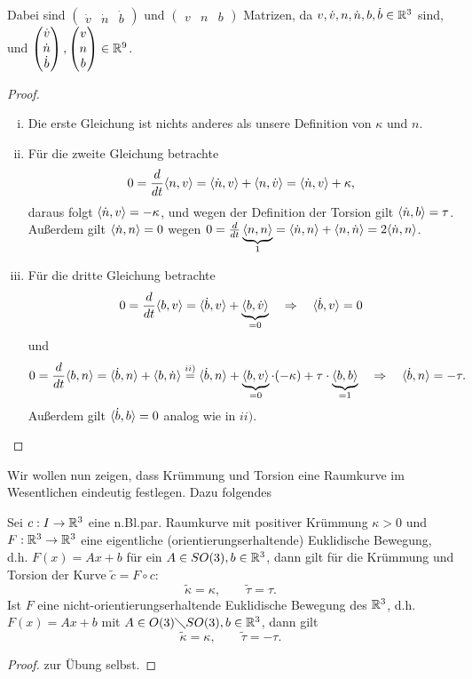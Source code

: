 \documentclass[11pt]{scrbook}
\begin{document}
\begin{st}
\begin{note*}
Dabei sind $\begin{pmatrix} \dot v & \dot n & \dot b \end{pmatrix}$ und $\begin{pmatrix}  v &  n &  b \end{pmatrix}$ Matrizen, da $v, \dot v, n, \dot n, b, \dot b \in \mathbb{R}^3$ sind, und $\begin{pmatrix} \dot v \\ \dot n \\ \dot b \end{pmatrix}, \begin{pmatrix}  v \\  n \\  b \end{pmatrix} \in \mathbb{R}^9$.
\end{note*}
\begin{proof}
\begin{enumerate}[i)]
\item
	Die erste Gleichung ist nichts anderes als unsere Definition von $\kappa$ und $n$.
\item
	Für die zweite Gleichung betrachte 
\[ 0 = \frac{d}{dt} \langle n, v \rangle = \langle \dot n, v \rangle + \langle n, \dot v \rangle = \langle \dot n, v \rangle + \kappa ,\]
daraus folgt $\langle \dot n, v \rangle = - \kappa$, und wegen der Definition der Torsion gilt $\langle \dot n, b \rangle =  \tau$. Außerdem gilt $\langle \dot n, n \rangle = 0$ wegen $0 = \frac{d}{dt} \underbrace{\langle n, n \rangle}_{1} = \langle \dot n, n \rangle + \langle n, \dot n \rangle = 2 \langle \dot n, n \rangle$.
\item
	Für die dritte Gleichung betrachte
\[ 0 = \frac{d}{dt} \langle b, v \rangle = \langle \dot b, v \rangle + \underbrace{\langle b, \dot v \rangle}_{=0} \quad \Rightarrow \quad \langle \dot b, v \rangle = 0 \]
und 
\[ 0 = \frac{d}{dt} \langle b, n \rangle = \langle \dot b, n \rangle + \langle b, \dot n \rangle \stackrel{ii)}{=} \langle \dot b, n \rangle + \underbrace{\langle b, v \rangle}_{=0} \cdot (-\kappa) + \tau \cdot \underbrace{\langle b, b \rangle}_{=1} \quad \Rightarrow \quad \langle \dot b, n \rangle = - \tau. \]
Außerdem gilt $\langle \dot b, b \rangle = 0$ analog wie in $ii)$.
\end{enumerate}
\end{proof}
\end{st}

Wir wollen nun zeigen, dass Krümmung und Torsion eine Raumkurve im Wesentlichen eindeutig festlegen. Dazu folgendes 
\begin{lem}
\label{7.8}
Sei $c: I \to \mathbb{R}^3$ eine n.Bl.par. Raumkurve mit positiver Krümmung $\kappa > 0$ und $F: \mathbb{R}^3 \to \mathbb{R}^3$ eine eigentliche (orientierungserhaltende) Euklidische Bewegung, d.h. $F(x) = Ax + b$ für ein $A \in SO(3), b \in \mathbb{R}^3$, dann gilt für die Krümmung und Torsion der Kurve $\tilde c = F  \circ c:$ \[ \tilde \kappa = \kappa, \qquad \tilde \tau = \tau. \]
Ist $F$ eine nicht-orientierungserhaltende Euklidische Bewegung des $\mathbb{R}^3$, d.h. $F(x) = Ax + b$ mit $A \in O(3) \diagdown SO(3), b \in \mathbb{R}^3 $, dann gilt \[ \tilde \kappa = \kappa, \qquad \tilde \tau = - \tau. \]
\begin{proof}
zur Übung selbst.
\end{proof}
\end{lem}
\end{document}
